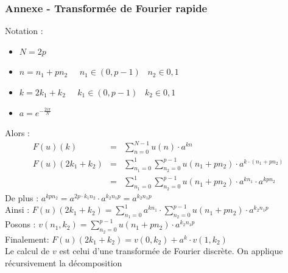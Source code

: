 \documentclass[french]{beamer}
\begin{document}
\begin{frame}[allowframebreaks]
	\frametitle{Annexe - Transformée de Fourier rapide}
	Notation :
	\begin{itemize}
		\item $N = 2p$
		\item $n = n_1 + pn_2 \;\;\;\;\; n_1 \in (0, p-1) \;\;\; n_2 \in {0, 1}$
		\item $k = 2k_1 + k_2 \;\;\;\;\; k_1 \in (0, p-1) \;\;\; k_2 \in {0, 1}$
		\item $a = e^{-\frac{2i\pi}{N}}$
	\end{itemize}
	Alors :
	\begin{eqnarray}
		F(u)(k) & = & \sum\limits_{n = 0}^{N-1} u(n) \cdot a^{kn} \\
		F(u)(2k_1 + k_2) & = & \sum\limits_{n_1 = 0}^{1} \sum\limits_{n_2 = 0}^{p-1} u(n_1 + pn_2) \cdot a^{k \cdot (n_1 + pn_2)} \\
		& = & \sum\limits_{n_1 = 0}^{1} \sum\limits_{n_2 = 0}^{p-1} u(n_1 + pn_2) \cdot a^{kn_1} \cdot a^{kpn_2}
	\end{eqnarray}
	De plus :
	$a^{kpn_2} = a^{2p \cdot k_1n_2} \cdot a^{k_2n_1p} = a^{k_2n_1p}$ \\
	Ainsi :
	$F(u)(2k_1 + k_2) = \sum\limits_{n_1 = 0}^{1} a^{kn_1} \cdot \sum\limits_{n_2 = 0}^{p-1} u(n_1 + pn_2) \cdot a^{k_2n_1p}$ \\
	Posons :
	$ v(n_1, k_2) = \sum\limits_{n_2 = 0}^{p-1} u(n_1 + pn_2) \cdot a^{k_2n_1p}$ \\
	Finalement: 
	$F(u)(2k_1 + k_2) = v(0, k_2) + a^{k} \cdot v(1, k_2)$\\
	Le calcul de $v$ est celui d'une transformée de Fourier discrète. On applique récursivement la décomposition
	\bigskip
\end{frame}
\end{document}
